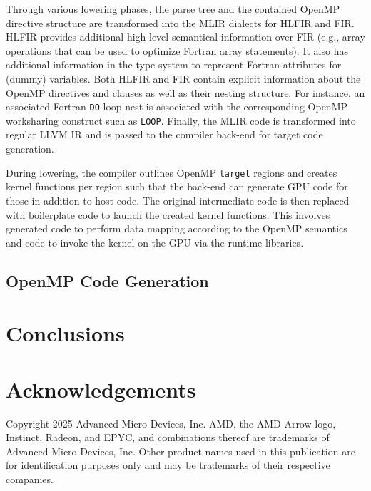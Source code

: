 \documentclass[acmtog,natbib=false]{acmart}
\newcommand{\code}[1]{\texttt{#1}\xspace}
\begin{document}
Through various lowering phases, the parse tree and the contained OpenMP directive structure are transformed into the \ac{MLIR} dialects for \ac{HLFIR} and \ac{FIR}.
\ac{HLFIR} provides additional high-level semantical information over \ac{FIR} (e.g., array operations that can be used to optimize Fortran array statements).
It also has additional information in the type system to represent Fortran attributes for (dummy) variables.
Both \ac{HLFIR} and \ac{FIR} contain explicit information about the OpenMP directives and clauses as well as their nesting structure.
For instance, an associated Fortran \code{DO} loop nest is associated with the corresponding OpenMP worksharing construct such as \code{LOOP}.
Finally, the \ac{MLIR} code is transformed into regular LLVM \ac{IR} and is passed to the compiler back-end for target code generation.

During lowering, the compiler outlines OpenMP \code{target} regions and creates kernel functions per region such that the back-end can generate \ac{GPU} code for those in addition to host code.
The original intermediate code is then replaced with boilerplate code to launch the created kernel functions.
This involves generated code to perform data mapping according to the OpenMP semantics and code to invoke the kernel on the GPU via the runtime libraries.

\subsection{OpenMP Code Generation}
\label{sec:OpenMPCodeGen}




\section{Conclusions}
\label{sec:Conclusions}



\section*{Acknowledgements}
Copyright 2025 Advanced Micro Devices, Inc.
AMD, the AMD Arrow logo, Instinct, Radeon, and EPYC, and combinations thereof are trademarks of Advanced Micro Devices, Inc.
Other product names used in this publication are for identification purposes only and may be trademarks of their respective companies.

\printbibliography
\end{document}
